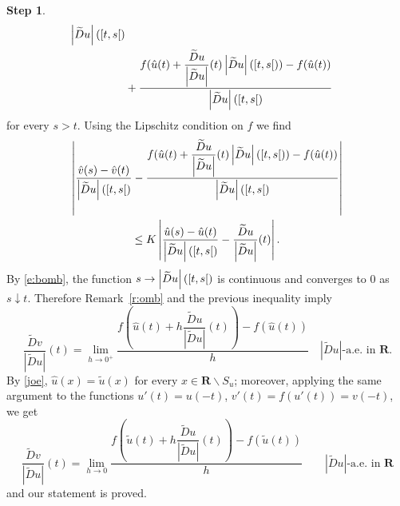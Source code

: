 \documentclass[manuscript, printscheme]{aomart}
\newtheorem[{}\it]{thm}{Theorem}[section]
\theoremstyle{definition}
\newtheorem*[{}\it]{notation}{Notation}
\newtheorem{step}{Step}
\newcommand{\wt}{\widetilde}
\newcommand{\interval}[1]{\mathinner{#1}}
\newcommand{\envert}[1]{\left\lvert#1\right\rvert}
\let\abs=\envert
\begin{document}
\begin{step}
\begin{equation*}
\begin{split}
{\abs{\wt{D}u}(\interval{\left[t,s\right[})}\\
&+\frac
{f(\hat u(t)+\dfrac{\wt{D}u}{\abs{\wt{D}u}}(t)\abs{\wt{D}
u}(\interval{\left[t,s\right[}))-f(\hat
u(t))}{\abs{\wt{D}u}(\interval{\left[t,s\right[})}
\end{split}\end{equation*}
for every $s>t$. Using the Lipschitz condition on $f$ we find
{\setlength{\multlinegap}{0pt}
\begin{multline*}
\left\lvert\frac{\hat v(s)-\hat
v(t)}{\abs{\wt{D}u}(\interval{\left[t,s\right[})} -\frac{f(\hat
u(t)+\dfrac{\wt{D}u}{\abs{\wt{D}u}}(t)
\abs{\wt{D}u}(\interval{\left[t,s\right[}))-f(\hat
u(t))}{\abs{\wt{D}u}(\interval{\left[t,s\right[})}\right\rvert\\
\le K\left\lvert
\frac{\hat u(s)-\hat u(t)}
  {\abs{\wt{D}u}(\interval{\left[t,s\right[})}
-\frac{\wt{D}u}{\abs{
\wt{D}u}}(t)\right\rvert.\end{multline*}
}%
By \eqref{e:bomb}, the function $s\to
\abs{\wt{D}u}(\interval{\left[t,s\right[})$ is continuous and
converges to 0 as $s\downarrow t$. Therefore Remark~\ref{r:omb} and the
previous inequality imply
\[\frac{\wt{D}v}{\abs{\wt{D}u}}(t)=\lim_{h\to 0^+}
\frac{f(\hat u(t)+h\dfrac{\wt{D}u}{\abs{\wt{D}u}}
(t))-f(\hat u(t))}h\quad\abs{\wt{D}u}\text{-a.e. in }\mathbf{R}.\]
By \eqref{joe}, $\hat u(x)=\tilde u(x)$ for every
$x\in\mathbf{R}\backslash S_u$; moreover, applying the same argument to
the functions $u'(t)=u(-t)$, $v'(t)=f(u'(t))=v(-t)$, we get
\[\frac{\wt{D}v}{\abs{\wt{D}u}}(t)=\lim_{h\to 0}
\frac{f(\tilde u(t)
+h\dfrac{\wt{D}u}{\abs{\wt{D}u}}(t))-f(\tilde u(t))}{h}
\qquad\abs{\wt{D}u}\text{-a.e. in }\mathbf{R}\]
and our statement is proved.
\end{step}
\end{document}
